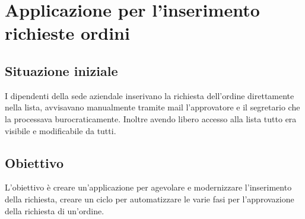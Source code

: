 \section{Applicazione per l'inserimento richieste ordini}
\subsection{Situazione iniziale}
I dipendenti della sede aziendale inserivano la richiesta dell'ordine direttamente nella lista, avvisavano manualmente tramite mail l'approvatore e il segretario che la processava burocraticamente. Inoltre avendo libero accesso alla lista tutto era visibile e modificabile da tutti.
\subsection{Obiettivo}
L'obiettivo è creare un'applicazione per agevolare e modernizzare l'inserimento della richiesta, creare un ciclo per automatizzare le varie fasi per l'approvazione della richiesta di un'ordine.

